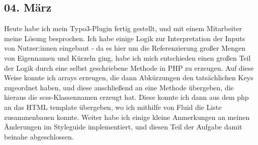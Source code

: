 \subsection{04. März}
Heute habe ich mein Typo3-Plugin fertig gestellt, und mit einem Mitarbeiter meine Lösung besprochen. Ich habe einige Logik zur Interpretation der Inputs von Nutzer:innen eingebaut - da es hier um die Referenzierung großer Mengen von Eigennamen und Kürzeln ging, habe ich mich entschieden einen großen Teil der Logik durch eine selbst geschriebene Methode in PHP zu erzeugen. Auf diese Weise konnte ich arrays erzeugen, die dann Abkürzungen den tatsächlichen Keys zugeordnet haben, und diese anschließend an eine Methode übergeben, die hieraus die scss-Klassennamen erzeugt hat. Diese konnte ich dann aus dem php an das HTML template übergeben, wo ich mithilfe von Fluid die Liste zusammenbauen konnte. Weiter habe ich einige kleine Anmerkungen an meinen Änderungen im Styleguide implementiert, und diesen Teil der Aufgabe damit beinahe abgeschlossen.